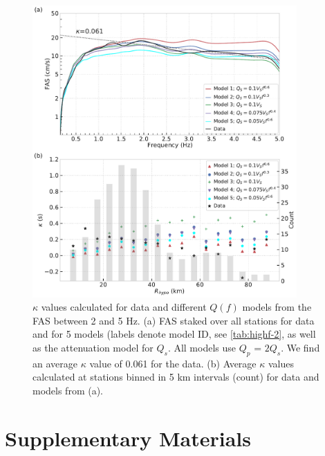 \begin{figure}[!ht]
  \centering
  \includegraphics[width=0.9\textwidth,height=0.9\textheight,keepaspectratio]{figures/figure_highf_15.pdf}
  \caption{$\kappa$ values calculated for data and different $Q(f)$ models from the FAS between 2 and 5 Hz. (a) FAS staked over all stations for data and for 5 models (labels denote model ID, see \cref{tab:highf-2}, as well as the attenuation model for $Q_s$. All models use $Q_p$ = $2Q_s$. We find an average $\kappa$ value of 0.061 for the data. (b) Average $\kappa$ values calculated at stations binned in 5 km intervals (count) for data and models from (a).
  }
  \label{fig:highf-15}
\end{figure}
\clearpage



\setcounter{table}{0}
\setcounter{figure}{0}
\renewcommand{\thetable}{S\arabic{chapter}.\arabic{table}}
\renewcommand{\thefigure}{S\arabic{chapter}.\arabic{figure}}
\newpage
\section*{Supplementary Materials}\label{highf:supplement}

